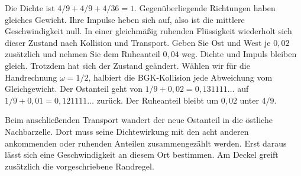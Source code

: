 Die Dichte ist \(4/9+4/9+4/36=1\). Gegenüberliegende Richtungen haben gleiches Gewicht. Ihre Impulse heben sich auf, also ist die mittlere Geschwindigkeit null. In einer gleichmäßig ruhenden Flüssigkeit wiederholt sich dieser Zustand nach Kollision und Transport.
Geben Sie Ost und West je \(0{,}02\) zusätzlich und nehmen Sie dem Ruheanteil \(0{,}04\) weg. Dichte und Impuls bleiben gleich. Trotzdem hat sich der Zustand geändert. Wählen wir für die Handrechnung \(\omega=1/2\), halbiert die BGK-Kollision jede Abweichung vom Gleichgewicht. Der Ostanteil geht von \(1/9+0{,}02=0{,}131111\ldots\) auf \(1/9+0{,}01=0{,}121111\ldots\) zurück. Der Ruheanteil bleibt um \(0{,}02\) unter \(4/9\).

Beim anschließenden Transport wandert der neue Ostanteil in die östliche Nachbarzelle. Dort muss seine Dichtewirkung mit den acht anderen ankommenden oder ruhenden Anteilen zusammengezählt werden. Erst daraus lässt sich eine Geschwindigkeit an diesem Ort bestimmen. Am Deckel greift zusätzlich die vorgeschriebene Randregel.

